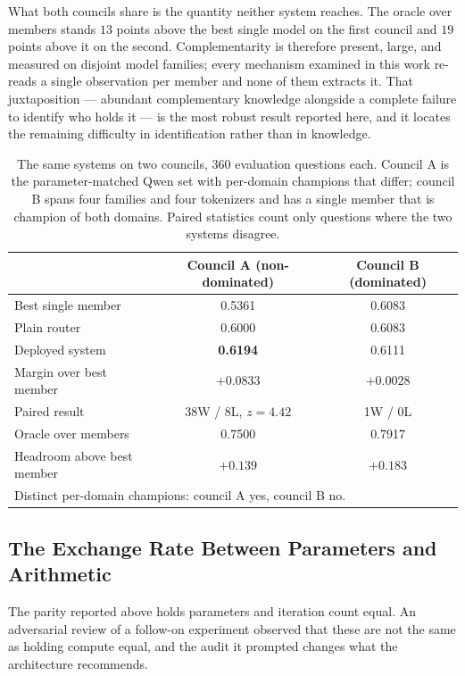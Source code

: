 What both councils share is the quantity neither system reaches. The oracle over
members stands $13$ points above the best single model on the first council and
$19$ points above it on the second. Complementarity is therefore present, large,
and measured on disjoint model families; every mechanism examined in this work
re-reads a single observation per member and none of them extracts it. That
juxtaposition --- abundant complementary knowledge alongside a complete failure
to identify who holds it --- is the most robust result reported here, and it
locates the remaining difficulty in identification rather than in knowledge.

\begin{table}[t]
\centering
\caption{The same systems on two councils, 360 evaluation questions each.
Council A is the parameter-matched Qwen set with per-domain champions that
differ; council B spans four families and four tokenizers and has a single
member that is champion of both domains. Paired statistics count only questions
where the two systems disagree.}
\label{tab:condition}
\begin{tabular}{lcc}
\toprule
 & Council A (non-dominated) & Council B (dominated) \\
\midrule
Best single member          & 0.5361 & 0.6083 \\
Plain router                & 0.6000 & 0.6083 \\
Deployed system             & \textbf{0.6194} & 0.6111 \\
Margin over best member     & $\mathbf{+0.0833}$ & $+0.0028$ \\
Paired result               & 38W / 8L, $z = 4.42$ & 1W / 0L \\
\midrule
Oracle over members         & 0.7500 & 0.7917 \\
Headroom above best member  & $+0.139$ & $+0.183$ \\
\bottomrule
\multicolumn{3}{l}{\footnotesize Distinct per-domain champions: council A yes, council B no.} \\
\end{tabular}
\end{table}

\subsection{The Exchange Rate Between Parameters and Arithmetic}
\label{sec:results:compute}

The parity reported above holds parameters and iteration count equal. An
adversarial review of a follow-on experiment observed that these are not the
same as holding compute equal, and the audit it prompted changes what the
architecture recommends.

